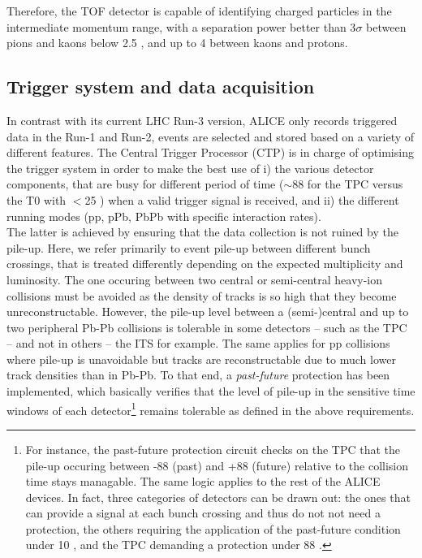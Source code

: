 Therefore, the TOF detector is capable of identifying charged particles in the intermediate momentum range, with a separation power better than 3$\sigma$ between pions and kaons below 2.5 \gmom, and up to 4 \gmom between kaons and protons.

\subsection{Trigger system and data acquisition}

In contrast with its current LHC Run-3 version, ALICE only records triggered data in the Run-1 and Run-2, \ie events are selected and stored based on a variety of different features. The Central Trigger Processor (CTP) is in charge of optimising the trigger system in order to make the best use of i) the various detector components, that are busy for different period of time ($\sim$88 \musec for the TPC versus the T0 with $<$25 \nsec) when a valid trigger signal is received, and ii) the different running modes (pp, pPb, PbPb with specific interaction rates).\\

The latter is achieved by ensuring that the data collection is not ruined by the pile-up. Here, we refer primarily to event pile-up between different bunch crossings, that is treated differently depending on the expected multiplicity and luminosity. The one occuring between two central or semi-central heavy-ion collisions must be avoided as the density of tracks is so high that they become unreconstructable. However, the pile-up level between a (semi-)central and up to two peripheral Pb-Pb collisions is tolerable in some detectors -- such as the TPC -- and not in others -- the ITS for example. The same applies for pp collisions where pile-up is unavoidable but tracks are reconstructable due to much lower track densities than in Pb-Pb. To that end, a \textit{past-future} protection has been implemented, which basically verifies that the level of pile-up in the sensitive time windows of each detector\footnote{For instance, the past-future protection circuit checks on the TPC that the pile-up occuring between -88 \musec (past) and +88 \musec (future) relative to the collision time stays managable. The same logic applies to the rest of the ALICE devices. In fact, three categories of detectors can be drawn out: the ones that can provide a signal at each bunch crossing and thus do not not need a protection, the others requiring the application of the past-future condition under 10 \musec, and the TPC demanding a protection under 88 \musec.} remains tolerable as defined in the above requirements.\\

